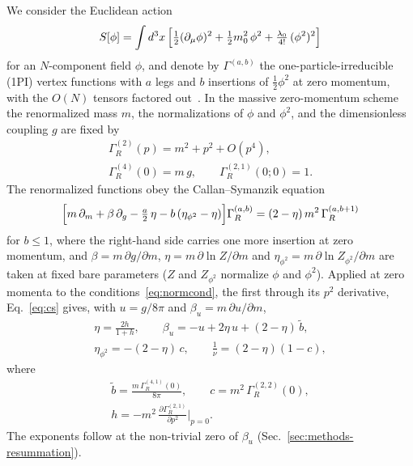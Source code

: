 We consider the Euclidean action
\begin{equation}
S[\phi]=\int d^3x\,\Bigl[\tfrac12(\partial_\mu\phi)^2+\tfrac12 m_0^2\,\phi^2+\tfrac{\lambda_0}{4!}\,(\phi^2)^2\Bigr]
\label{eq:action}
\end{equation}
for an $N$-component field $\phi$, and denote by $\Gamma^{(a,b)}$ the one-particle-irreducible (1PI) vertex functions
with $a$ legs and $b$ insertions of $\tfrac12\phi^2$ at zero momentum, with the $O(N)$ tensors factored
out~\cite{ZinnJustinBook,Ribeca2003thesis}. In the massive zero-momentum scheme~\cite{Parisi1980,BNGM1976,BNM1978}
the renormalized mass $m$, the normalizations of $\phi$ and $\phi^2$, and the dimensionless coupling $g$ are fixed by
\begin{gather}
\Gamma^{(2)}_R(p)=m^2+p^2+O(p^4),\nonumber\\
\Gamma^{(4)}_R(0)=m\,g,\qquad \Gamma^{(2,1)}_R(0;0)=1 .
\label{eq:normcond}
\end{gather}
The renormalized functions obey the Callan--Symanzik equation~\cite{ZinnJustinBook,Ribeca2003thesis}
\begin{equation}
\Bigl[m\,\partial_m+\beta\,\partial_g-\tfrac a2\,\eta-b\,(\eta_{\phi^2}-\eta)\Bigr]\Gamma^{(a,b)}_R
=(2-\eta)\,m^2\,\Gamma^{(a,b+1)}_R
\label{eq:cs}
\end{equation}
for $b\le1$, where the right-hand side carries one more insertion at zero momentum, and $\beta=m\,\partial g/\partial m$,
$\eta=m\,\partial\ln Z/\partial m$ and $\eta_{\phi^2}=m\,\partial\ln Z_{\phi^2}/\partial m$ are taken at fixed bare
parameters ($Z$ and $Z_{\phi^2}$ normalize $\phi$ and $\phi^2$). Applied at zero momenta to the conditions~\eqref{eq:normcond}, the first through its
$p^2$ derivative, Eq.~\eqref{eq:cs} gives, with $u=g/8\pi$ and $\beta_u=m\,\partial u/\partial m$,
\begin{gather}
\eta=\frac{2h}{1+h},\qquad \beta_u=-u+2\eta\,u+(2-\eta)\,\tilde b,\nonumber\\
\eta_{\phi^2}=-(2-\eta)\,c,\qquad \frac1\nu=(2-\eta)(1-c),
\label{eq:csrel}
\end{gather}
where
\begin{gather}
\tilde b=\frac{m\,\Gamma^{(4,1)}_R(0)}{8\pi},\qquad c=m^2\,\Gamma^{(2,2)}_R(0),\nonumber\\
h=-m^2\,\frac{\partial\Gamma^{(2,1)}_R}{\partial p^2}\bigg|_{p=0}.
\label{eq:bhc}
\end{gather}
The exponents follow at the non-trivial zero of $\beta_u$ (Sec.~\ref{sec:methods-resummation}).


